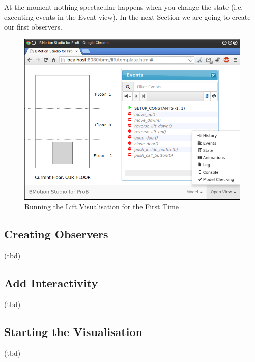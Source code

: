 At the moment nothing spectacular happens when you change the state (i.e. executing events in the Event view).
In the next Section we are going to create our first observers.

\begin{figure}[!ht]
\begin{center}
	\includegraphics[width=\textwidth]{img/tutorial/tut_03.png}
	\caption{Running the Lift Visualisation for the First Time}
	\label{fig_tut_03_running1}
\end{center}
\end{figure}

\subsection{Creating Observers}
\label{sec_creation_observers}

(tbd)

\subsection{Add Interactivity}

(tbd)

\subsection{Starting the Visualisation}

(tbd)
